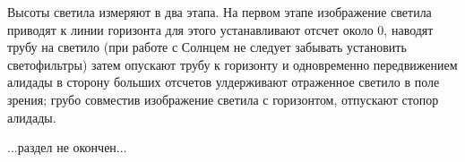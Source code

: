 Высоты светила измеряют в два этапа. На первом этапе изображение
светила приводят к линии горизонта для этого устанавливают отсчет
около 0\gr, наводят трубу на светило (при работе с Солнцем не следует
забывать установить светофильтры) затем опускают трубу к горизонту и
одновременно передвижением алидады в сторону больших отсчетов
улдерживают отраженное светило в поле зрения; грубо совместив
изображение светила с горизонтом, отпускают стопор алидады.


...раздел не окончен...

\onecolumn

